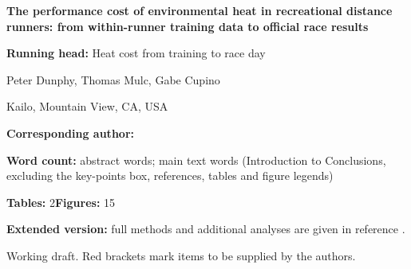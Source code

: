 \documentclass[12pt]{article}
\begin{document}
\begin{titlepage}
\begin{flushleft}
{\Large\bfseries The performance cost of environmental heat in recreational distance runners: from within-runner training data to official race results\par}
\vspace{1.2em}
\textbf{Running head:} Heat cost from training to race day\par
\vspace{1.2em}
Peter Dunphy, Thomas Mulc, Gabe Cupino\par
\vspace{0.4em}
Kailo, Mountain View, CA, USA\par
\vspace{1.4em}
\textbf{Corresponding author:} \par
\vspace{1.4em}
\textbf{Word count:} abstract \wcAbstract{} words; main text \wcMain{} words (Introduction to Conclusions, excluding the key-points box, references, tables and figure legends)\par
\textbf{Tables:} 2\quad \textbf{Figures:} 15\par
\vspace{1.4em}
\textbf{Extended version:} full methods and additional analyses are given in reference .\par
\vspace{1.4em}
{\small\textcolor{otred}{Working draft. Red brackets mark items to be supplied by the authors.}\par}
\end{flushleft}
\end{titlepage}
\end{document}
